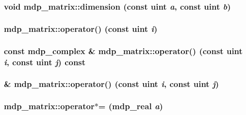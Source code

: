 \label{classmdp__matrix_a37512f689166e890038ec9688d3a171e}
\hypertarget{classmdp__matrix_a980d0f0a42bb19ba9135a0bf97d85c76}{
\subsubsection[{dimension}]{\setlength{\rightskip}{0pt plus 5cm}void mdp\_\-matrix::dimension (const {\bf uint} {\em a}, \/  const {\bf uint} {\em b})}}
\label{classmdp__matrix_a980d0f0a42bb19ba9135a0bf97d85c76}
\hypertarget{classmdp__matrix_aef809061e550a0587af45e098810c95e}{
\subsubsection[{operator()}]{ mdp\_\-matrix::operator() (const {\bf uint} {\em i})}}
\label{classmdp__matrix_aef809061e550a0587af45e098810c95e}
\hypertarget{classmdp__matrix_a0081ae88c0b89ec503ff7fe37d40a76d}{
\subsubsection[{operator()}]{\setlength{\rightskip}{0pt plus 5cm}const {\bf mdp\_\-complex} \& mdp\_\-matrix::operator() (const {\bf uint} {\em i}, \/  const {\bf uint} {\em j}) const}}
\label{classmdp__matrix_a0081ae88c0b89ec503ff7fe37d40a76d}
\hypertarget{classmdp__matrix_a820c578eaf97324bec338827db42b8e6}{
\subsubsection[{operator()}]{ \& mdp\_\-matrix::operator() (const {\bf uint} {\em i}, \/  const {\bf uint} {\em j})}}
\label{classmdp__matrix_a820c578eaf97324bec338827db42b8e6}
\hypertarget{classmdp__matrix_ae933b4a3f23b00dcd22f0fcf4c80379d}{
\subsubsection[{operator$\ast$=}]{ mdp\_\-matrix::operator$\ast$= ({\bf mdp\_\-real} {\em a})}}
